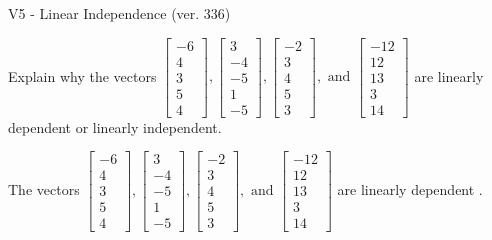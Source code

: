 \begin{exercise}
  \begin{exerciseTitle}V5 - Linear Independence (ver. 336)\end{exerciseTitle}
  \begin{exerciseStatement}
    Explain why the vectors \(\left[\begin{array}{r}
-6 \\
4 \\
3 \\
5 \\
4
\end{array}\right] , \left[\begin{array}{r}
3 \\
-4 \\
-5 \\
1 \\
-5
\end{array}\right] , \left[\begin{array}{r}
-2 \\
3 \\
4 \\
5 \\
3
\end{array}\right] , \text{ and } \left[\begin{array}{r}
-12 \\
12 \\
13 \\
3 \\
14
\end{array}\right]\) are linearly dependent or linearly independent.	


  \end{exerciseStatement}
  \begin{exerciseAnswer}
   The vectors \(\left[\begin{array}{r}
-6 \\
4 \\
3 \\
5 \\
4
\end{array}\right] , \left[\begin{array}{r}
3 \\
-4 \\
-5 \\
1 \\
-5
\end{array}\right] , \left[\begin{array}{r}
-2 \\
3 \\
4 \\
5 \\
3
\end{array}\right] , \text{ and } \left[\begin{array}{r}
-12 \\
12 \\
13 \\
3 \\
14
\end{array}\right]\) are 
  	 linearly dependent  .
  


  \end{exerciseAnswer}
\end{exercise}
